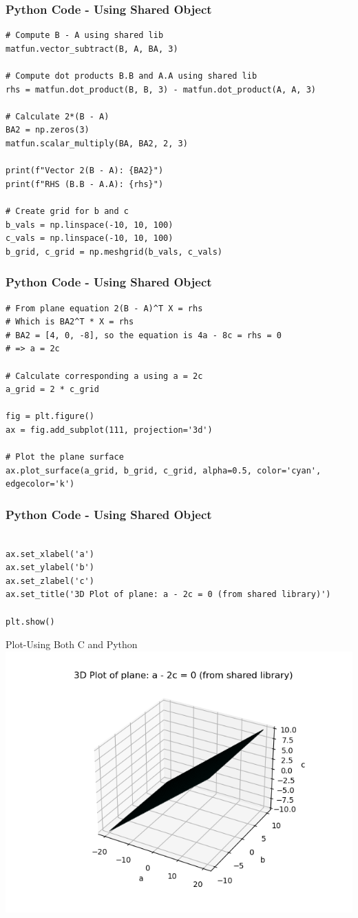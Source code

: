 \documentclass{beamer}
\numberwithin{equation}{section}
\begin{document}
\begin{frame}[fragile]
    \frametitle{Python Code - Using Shared Object}
    \begin{lstlisting}
# Compute B - A using shared lib
matfun.vector_subtract(B, A, BA, 3)

# Compute dot products B.B and A.A using shared lib
rhs = matfun.dot_product(B, B, 3) - matfun.dot_product(A, A, 3)

# Calculate 2*(B - A)
BA2 = np.zeros(3)
matfun.scalar_multiply(BA, BA2, 2, 3)

print(f"Vector 2(B - A): {BA2}")
print(f"RHS (B.B - A.A): {rhs}")

# Create grid for b and c
b_vals = np.linspace(-10, 10, 100)
c_vals = np.linspace(-10, 10, 100)
b_grid, c_grid = np.meshgrid(b_vals, c_vals)

\end{lstlisting}
\end{frame}
\begin{frame}[fragile]
    \frametitle{Python Code - Using Shared Object}
    \begin{lstlisting}
# From plane equation 2(B - A)^T X = rhs
# Which is BA2^T * X = rhs
# BA2 = [4, 0, -8], so the equation is 4a - 8c = rhs = 0
# => a = 2c

# Calculate corresponding a using a = 2c
a_grid = 2 * c_grid

fig = plt.figure()
ax = fig.add_subplot(111, projection='3d')

# Plot the plane surface
ax.plot_surface(a_grid, b_grid, c_grid, alpha=0.5, color='cyan', edgecolor='k')

\end{lstlisting}
\end{frame}
\begin{frame}[fragile]
    \frametitle{Python Code - Using Shared Object}
    \begin{lstlisting}

ax.set_xlabel('a')
ax.set_ylabel('b')
ax.set_zlabel('c')
ax.set_title('3D Plot of plane: a - 2c = 0 (from shared library)')

plt.show()

\end{lstlisting}
\end{frame}

\begin{frame}{Plot-Using Both C and Python}
    \centering
    \includegraphics[width=\columnwidth, height=0.8\textheight, keepaspectratio]{FIG/fig2.png}     
\end{frame}
\end{document}
